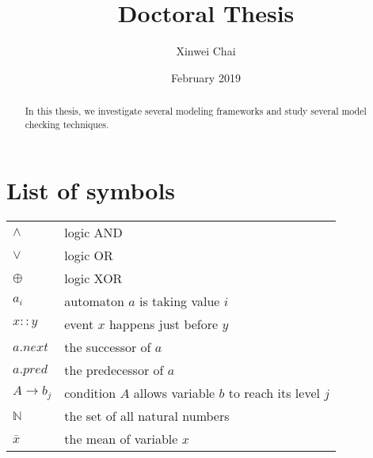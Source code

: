 \documentclass[12pt]{report}
\title{Doctoral Thesis}
\date{February 2019}
\author{Xinwei Chai}
\theoremstyle{definition}
\begin{document}
\maketitle
\tableofcontents
\listoffigures
\listoftables
\begin{abstract}
In this thesis, we investigate several modeling frameworks and study several model checking techniques.
\end{abstract}

\chapter*{List of symbols}
\begin{tabular}{l|l}
    $\land$ & logic AND\\
    $\lor$ & logic OR\\
    $\oplus$ & logic XOR\\
    $a_i$  & automaton $a$ is taking value $i$ \\
    $x::y$ & event $x$ happens just before $y$\\
    $a.next$&the successor of $a$\\
    $a.pred$ & the predecessor of $a$\\
    $A\to b_j$ & condition $A$ allows variable $b$ to reach its level $j$\\
    $\mathbb{N}$ & the set of all natural numbers\\
    $\bar{x}$ & the mean of variable $x$
\end{tabular}






















\appendix

\end{document}
